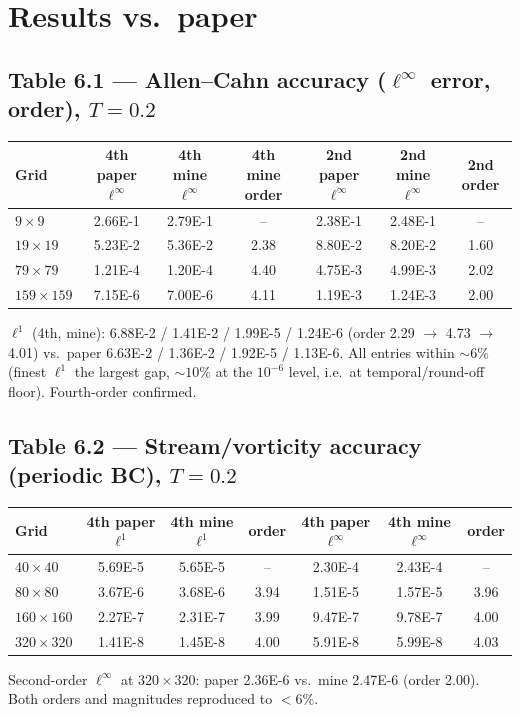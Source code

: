 \documentclass[11pt]{article}
\begin{document}
\section{Results vs.\ paper}

\subsection{Table 6.1 --- Allen--Cahn accuracy ($\ell^\infty$ error, order), $T=0.2$}
\begin{center}
\begin{tabular}{lcccccc}
\toprule
Grid & 4th paper $\ell^\infty$ & 4th mine $\ell^\infty$ & 4th mine order & 2nd paper $\ell^\infty$ & 2nd mine $\ell^\infty$ & 2nd order \\
\midrule
$9\times9$    & 2.66E-1 & 2.79E-1 & --   & 2.38E-1 & 2.48E-1 & --   \\
$19\times19$  & 5.23E-2 & 5.36E-2 & 2.38 & 8.80E-2 & 8.20E-2 & 1.60 \\
$79\times79$  & 1.21E-4 & 1.20E-4 & 4.40 & 4.75E-3 & 4.99E-3 & 2.02 \\
$159\times159$& 7.15E-6 & 7.00E-6 & 4.11 & 1.19E-3 & 1.24E-3 & 2.00 \\
\bottomrule
\end{tabular}
\end{center}
$\ell^1$ (4th, mine): 6.88E-2 / 1.41E-2 / 1.99E-5 / 1.24E-6 (order 2.29 $\to$ 4.73 $\to$ 4.01) vs.\
paper 6.63E-2 / 1.36E-2 / 1.92E-5 / 1.13E-6. All entries within $\sim6\%$ (finest $\ell^1$ the
largest gap, $\sim 10\%$ at the $10^{-6}$ level, i.e.\ at temporal/round-off floor). Fourth-order
confirmed.

\subsection{Table 6.2 --- Stream/vorticity accuracy (periodic BC), $T=0.2$}
\begin{center}
\begin{tabular}{lcccccc}
\toprule
Grid & 4th paper $\ell^1$ & 4th mine $\ell^1$ & order & 4th paper $\ell^\infty$ & 4th mine $\ell^\infty$ & order \\
\midrule
$40\times40$   & 5.69E-5 & 5.65E-5 & --   & 2.30E-4 & 2.43E-4 & --   \\
$80\times80$   & 3.67E-6 & 3.68E-6 & 3.94 & 1.51E-5 & 1.57E-5 & 3.96 \\
$160\times160$ & 2.27E-7 & 2.31E-7 & 3.99 & 9.47E-7 & 9.78E-7 & 4.00 \\
$320\times320$ & 1.41E-8 & 1.45E-8 & 4.00 & 5.91E-8 & 5.99E-8 & 4.03 \\
\bottomrule
\end{tabular}
\end{center}
Second-order $\ell^\infty$ at $320\times320$: paper 2.36E-6 vs.\ mine 2.47E-6 (order 2.00). Both
orders and magnitudes reproduced to $<6\%$.
\end{document}
